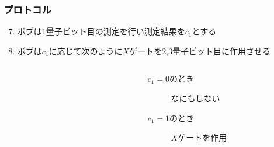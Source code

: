 \begin{frame}
  \frametitle{プロトコル}

  \begin{enumerate}
    \setcounter{enumi}{6}

    \item<+-> ボブは1量子ビット目の測定を行い測定結果を$c_1$とする
    \begin{figure}
    \end{figure}

    \item<+-> ボブは$c_1$に応じて次のように$X$ゲートを2,3量子ビット目に作用させる
    \begin{columns}
      \begin{column}{0.4\textwidth}
        \begin{figure}
        \end{figure}
      \end{column}
      \begin{column}{0.4\textwidth}
        \begin{description}
          \item[$c_1 = 0$のとき] なにもしない
          \item[$c_1 = 1$のとき] $X$ゲートを作用
        \end{description}
      \end{column}
    \end{columns}
  \end{enumerate}

  \pause
\end{frame}

